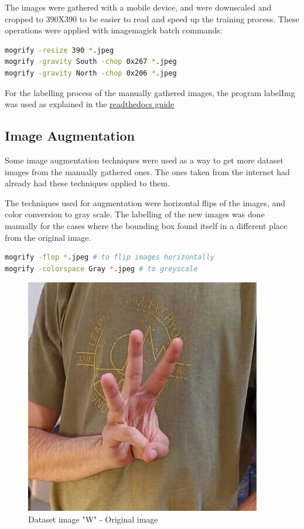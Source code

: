 \documentclass[10pt]{article}
\begin{document}
	The images were gathered with a mobile device, and were downscaled and cropped to 390X390 to be easier to read and speed up the training process. These operations were applied with imagemagick \cite{5} batch commands:

	\begin{lstlisting}[language=bash]
mogrify -resize 390 *.jpeg
mogrify -gravity South -chop 0x267 *.jpeg
mogrify -gravity North -chop 0x206 *.jpeg
	\end{lstlisting}
	
	For the labelling process of the manually gathered images, the program labelImg was used as explained in the \href{https://tensorflow-object-detection-api-tutorial.readthedocs.io/en/latest/training.html#preparing-the-dataset}{readthedocs guide} \cite{1}

	\pagebreak

	\subsection{Image Augmentation}

		Some image augmentation techniques were used as a way to get more dataset images from the manually gathered ones. The ones taken from the internet had already had these techniques applied to them.

		The techniques used for augmentation were horizontal flips of the images, and color conversion to gray scale. The labelling of the new images was done manually for the cases where the bounding box found itself in a different place from the original image.

		\begin{lstlisting}[language=bash]
mogrify -flop *.jpeg # to flip images horizontally
mogrify -colorspace Gray *.jpeg # to greyscale
		\end{lstlisting}

		\begin{figure}[H]
			\centering
			\includegraphics[scale=0.40]{imgs/W-m2.jpeg}
			\caption{Dataset image "W" - Original image}\label{fig:usage}
		\end{figure}
\end{document}
